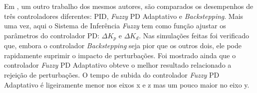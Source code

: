 
Em \cite{Gao2014Precision}, um outro trabalho dos mesmos autores, são comparados os desempenhos de três controladores diferentes: PID, \textit{Fuzzy} PD Adaptativo e \textit{Backstepping}. Mais uma vez, aqui o Sistema de Inferência \textit{Fuzzy} tem como função ajustar os parâmetros do controlador PD: $\Delta K_p$ e $\Delta K_d$. Nas simulações feitas foi verificado que, embora o controlador \textit{Backstepping} seja pior que os outros dois, ele pode rapidamente suprimir o impacto de perturbações. Foi mostrado ainda que o controlador \textit{Fuzzy} PD Adaptativo obteve o melhor resultado relacionado a rejeição de perturbações. O tempo de subida do controlador \textit{Fuzzy} PD Adaptativo é ligeiramente menor nos eixos x e z mas um pouco maior no eixo y.

%


